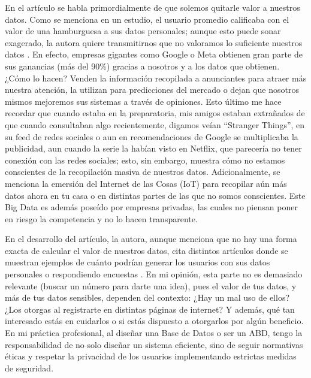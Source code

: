 En el artículo \cite{becerril2018value} se habla primordialmente de que solemos quitarle valor a nuestros datos. Como se menciona en un estudio, el usuario promedio calificaba con el valor de una hamburguesa a sus datos personales; aunque esto puede sonar exagerado, la autora quiere transmitirnos que no valoramos lo suficiente nuestros datos \cite{becerril2018value}. En efecto, empresas gigantes como Google o Meta obtienen gran parte de sus ganancias (más del 90\%) gracias a nosotros y a los datos que obtienen. ¿Cómo lo hacen? Venden la información recopilada a anunciantes para atraer más nuestra atención, la utilizan para predicciones del mercado o dejan que nosotros mismos mejoremos sus sistemas a través de opiniones. Esto último me hace recordar que cuando estaba en la preparatoria, mis amigos estaban extrañados de que cuando consultaban algo recientemente, digamos veían ``Stranger Things'', en su feed de redes sociales o aun en recomendaciones de Google se multiplicaba la publicidad, aun cuando la serie la habían visto en Netflix, que parecería no tener conexión con las redes sociales; esto, sin embargo, muestra cómo no estamos conscientes de la recopilación masiva de nuestros datos. Adicionalmente, se menciona la emersión del Internet de las Cosas (IoT) para recopilar aún más datos ahora en tu casa o en distintas partes de las que no somos conscientes. Este Big Data es además poseído por empresas privadas, las cuales no piensan poner en riesgo la competencia y no lo hacen transparente.

En el desarrollo del artículo, la autora, aunque menciona que no hay una forma exacta de calcular el valor de nuestros datos, cita distintos artículos donde se muestran ejemplos de cuánto podrían generar los usuarios con sus datos personales o respondiendo encuestas \cite{becerril2018value}. En mi opinión, esta parte no es demasiado relevante (buscar un número para darte una idea), pues el valor de tus datos, y más de tus datos sensibles, dependen del contexto: ¿Hay un mal uso de ellos? ¿Los otorgas al registrarte en distintas páginas de internet? Y además, qué tan interesado estás en cuidarlos o si estás dispuesto a otorgarlos por algún beneficio. En mi práctica profesional, al diseñar una Base de Datos o ser un ABD, tengo la responsabilidad de no solo diseñar un sistema eficiente, sino de seguir normativas éticas y respetar la privacidad de los usuarios implementando estrictas medidas de seguridad.

